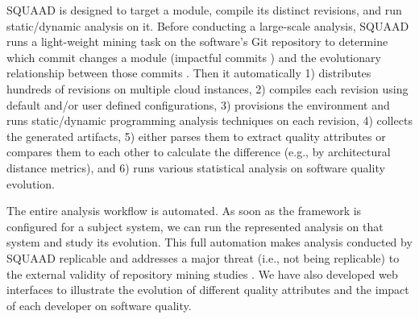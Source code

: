 
SQUAAD is designed to target a module, compile its distinct revisions, and run static/dynamic analysis on it.
Before conducting a large-scale analysis, SQUAAD runs a light-weight mining task on the software's Git repository to determine which commit changes a module (impactful commits \citep{Behnamghader2017qrs}) and the evolutionary relationship between those commits \citep{Behnamghader2018esem}.
Then it automatically
1) distributes hundreds of revisions on multiple cloud instances,
2) compiles each revision using default and/or user defined configurations,
3) provisions the environment and runs static/dynamic programming analysis techniques on each revision,
4) collects the generated artifacts,
5) either parses them to extract quality attributes or compares them to each other to calculate the difference (e.g., by architectural distance metrics), and
6) runs various statistical analysis on software quality evolution.

The entire analysis workflow is automated. As soon as the framework is configured for a subject system, we can run the represented analysis on that system and study its evolution.
This full automation makes analysis conducted by SQUAAD replicable and addresses a major threat (i.e., not being replicable) to the external validity of repository mining studies \citep{Trautsch:2016:APE:2901739.2901753}.
We have also developed web interfaces to illustrate the evolution of different quality attributes and the impact of each developer on software quality.

